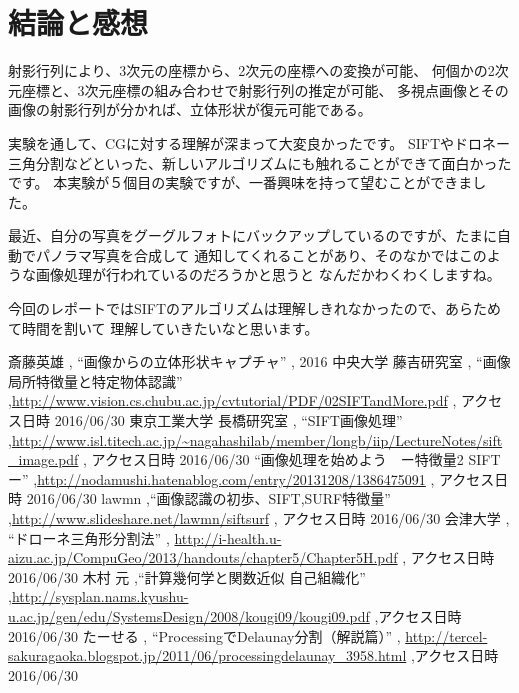 \documentclass[11pt,a4j]{jsarticle}
\begin{document}
\section{結論と感想}
\label{sec:結論と感想}
射影行列により、3次元の座標から、2次元の座標への変換が可能、
何個かの2次元座標と、3次元座標の組み合わせで射影行列の推定が可能、
多視点画像とその画像の射影行列が分かれば、立体形状が復元可能である。

実験を通して、CGに対する理解が深まって大変良かったです。
SIFTやドロネー三角分割などといった、新しいアルゴリズムにも触れることができて面白かったです。
本実験が５個目の実験ですが、一番興味を持って望むことができました。

最近、自分の写真をグーグルフォトにバックアップしているのですが、たまに自動でパノラマ写真を合成して
通知してくれることがあり、そのなかではこのような画像処理が行われているのだろうかと思うと
なんだかわくわくしますね。

今回のレポートではSIFTのアルゴリズムは理解しきれなかったので、あらためて時間を割いて
理解していきたいなと思います。


\begin{thebibliography}{9} %
 斎藤英雄 , ``画像からの立体形状キャプチャ'' , 2016
 中央大学 藤吉研究室 , ``画像局所特徴量と特定物体認識'' ,\url{http://www.vision.cs.chubu.ac.jp/cvtutorial/PDF/02SIFTandMore.pdf} , アクセス日時 2016/06/30
 東京工業大学 長橋研究室 , ``SIFT画像処理'' ,\url{http://www.isl.titech.ac.jp/~nagahashilab/member/longb/iip/LectureNotes/sift_image.pdf} , アクセス日時 2016/06/30
 ``画像処理を始めよう　ー特徴量2 SIFTー'' ,\url{http://nodamushi.hatenablog.com/entry/20131208/1386475091} , アクセス日時 2016/06/30
 lawmn ,``画像認識の初歩、SIFT,SURF特徴量'' ,\url{http://www.slideshare.net/lawmn/siftsurf} , アクセス日時 2016/06/30
 会津大学 , ``ドローネ三角形分割法'' , \url{http://i-health.u-aizu.ac.jp/CompuGeo/2013/handouts/chapter5/Chapter5H.pdf} , アクセス日時 2016/06/30
 木村 元 ,``計算幾何学と関数近似 自己組織化'' ,\url{http://sysplan.nams.kyushu-u.ac.jp/gen/edu/SystemsDesign/2008/kougi09/kougi09.pdf} ,アクセス日時 2016/06/30
 たーせる , ``ProcessingでDelaunay分割（解説篇）'' , \url{http://tercel-sakuragaoka.blogspot.jp/2011/06/processingdelaunay_3958.html} ,アクセス日時 2016/06/30
\end{thebibliography}
\end{document}
